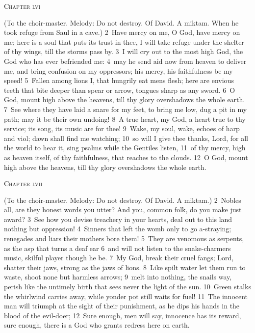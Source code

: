 \documentclass[10pt]{book} %
\begin{document}
\begin{large}\begin{center}\textsc{Chapter lvi}\end{center}\end{large}
(To the choir-master. Melody: Do not destroy. Of David. A miktam. When he took refuge from Saul in a cave.)
\textcolor{benred8}{2}~Have mercy on me, O God, have mercy on me; here is a soul that puts its trust in thee, I will take refuge under the shelter of thy wings, till the storms pass by. \textcolor{benred8}{3}~I will cry out to the most high God, the God who has ever befriended me: \textcolor{benred8}{4}~may he send aid now from heaven to deliver me, and bring confusion on my oppressors; his mercy, his faithfulness be my speed! \textcolor{benred8}{5}~Fallen among lions I, that hungrily eat men\textquotesingle s flesh; here are envious teeth that bite deeper than spear or arrow, tongues sharp as any sword. \textcolor{benred8}{6}~O God, mount high above the heavens, till thy glory overshadows the whole earth. \textcolor{benred8}{7}~See where they have laid a snare for my feet, to bring me low, dug a pit in my path; may it be their own undoing! \textcolor{benred8}{8}~A true heart, my God, a heart true to thy service; its song, its music are for thee! \textcolor{benred8}{9}~Wake, my soul, wake, echoes of harp and viol; dawn shall find me watching; \textcolor{benred8}{10}~so will I give thee thanks, Lord, for all the world to hear it, sing psalms while the Gentiles listen, \textcolor{benred8}{11}~of thy mercy, high as heaven itself, of thy faithfulness, that reaches to the clouds. \textcolor{benred8}{12}~O God, mount high above the heavens, till thy glory overshadows the whole earth.
\begin{large}\begin{center}\textsc{Chapter lvii}\end{center}\end{large}
(To the choir-master. Melody: Do not destroy. Of David. A miktam.)
\textcolor{benred8}{2}~Nobles all, are they honest words you utter? And you, common folk, do you make just award? \textcolor{benred8}{3}~See how you devise treachery in your hearts, deal out to this land nothing but oppression! \textcolor{benred8}{4}~Sinners that left the womb only to go a-straying; renegades and liars their mothers bore them! \textcolor{benred8}{5}~They are venomous as serpents, as the asp that turns a deaf ear \textcolor{benred8}{6}~and will not listen to the snake-charmer\textquotesingle s music, skilful player though he be. \textcolor{benred8}{7}~My God, break their cruel fangs; Lord, shatter their jaws, strong as the jaws of lions. \textcolor{benred8}{8}~Like spilt water let them run to waste, shoot none but harmless arrows; \textcolor{benred8}{9}~melt into nothing, the snail\textquotesingle s way, perish like the untimely birth that sees never the light of the sun. \textcolor{benred8}{10}~Green stalks the whirlwind carries away, while yonder pot still waits for fuel! \textcolor{benred8}{11}~The innocent man will triumph at the sight of their punishment, as he dips his hands in the blood of the evil-doer; \textcolor{benred8}{12}~Sure enough, men will say, innocence has its reward, sure enough, there is a God who grants redress here on earth.
\end{document}

